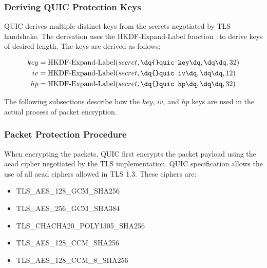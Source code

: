 \subsubsection{Deriving QUIC Protection Keys}\label{sec:02-encryption-key-derivation}

QUIC derives multiple distinct keys from the secrets negotiated by TLS handshake. The derivation
uses the HKDF-Expand-Label function~\cite{rfc5869} to derive keys of desired length. The keys are
derived as follows:

\begin{equation*}
  \begin{split}
    key & = \operatorname{HKDF-Expand-Label}(secret, \texttt{\dq{}quic key\dq}, \texttt{\dq\dq}, 32) \\
    iv & = \operatorname{HKDF-Expand-Label}(secret, \texttt{\dq{}quic iv\dq}, \texttt{\dq\dq}, 12) \\
    hp & = \operatorname{HKDF-Expand-Label}(secret, \texttt{\dq{}quic hp\dq}, \texttt{\dq\dq}, 32) \\
  \end{split}
\end{equation*}

The following subsections describe how the $key$, $iv$, and $hp$ keys are used in the actual process
of packet encryption.

\subsubsection{Packet Protection Procedure}

When encrypting the packets, QUIC first encrypts the packet payload using the \gls{aead} cipher negotiated
by the TLS implementation. QUIC specification allows the use of all \gls{aead} ciphers allowed in TLS 1.3.
These ciphers are:

\begin{itemize}

  \item TLS\_AES\_128\_GCM\_SHA256

  \item TLS\_AES\_256\_GCM\_SHA384

  \item TLS\_CHACHA20\_POLY1305\_SHA256

  \item TLS\_AES\_128\_CCM\_SHA256

  \item TLS\_AES\_128\_CCM\_8\_SHA256

\end{itemize}


